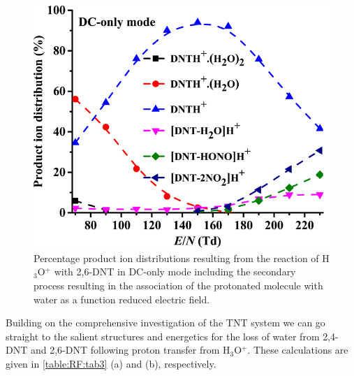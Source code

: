 \begin{figure}%
\centering
\includegraphics[height=0.3\textheight]{pics/RFpaper_fig8.png}
\caption{Percentage product ion distributions resulting from the reaction of H$_3$O$^+$ with 2,6-DNT in DC-only mode including the secondary process resulting in the association of the protonated molecule with water as a function reduced electric field.}
\label{fig:RF8}
\end{figure}

Building on the comprehensive investigation of the TNT system we can go straight to the salient structures and energetics for the loss of water from 2,4-DNT and 2,6-DNT following proton transfer from H$_3$O$^+$. These calculations are given in \autoref{table:RF:tab3} (a) and (b), respectively.

